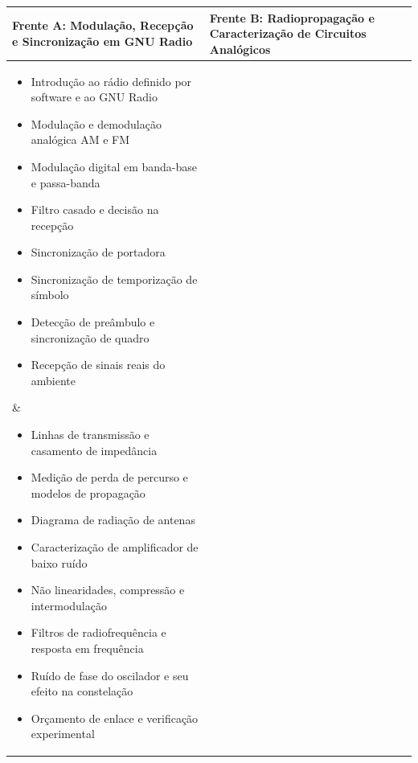 \documentclass[11pt,a4paper]{article}
\begin{document}
\begin{center}
\small
\begin{tabular}{|p{}|p{}|}
\hline
\textbf{Frente A: Modulação, Recepção e Sincronização em GNU Radio} & \textbf{Frente B: Radiopropagação e Caracterização de Circuitos Analógicos} \\
\hline
\parbox[t]{0.42\textwidth}{%
  \vspace{0.2em}
  \begin{itemize}[noitemsep, leftmargin=*, nosep, font=\small]
    \item Introdução ao rádio definido por software e ao GNU Radio
    \item Modulação e demodulação analógica AM e FM
    \item Modulação digital em banda-base e passa-banda
    \item Filtro casado e decisão na recepção
    \item Sincronização de portadora
    \item Sincronização de temporização de símbolo
    \item Detecção de preâmbulo e sincronização de quadro
    \item Recepção de sinais reais do ambiente
  \end{itemize}
  \vspace{0.2em}
} &
\parbox[t]{0.42\textwidth}{%
  \vspace{0.2em}
  \begin{itemize}[noitemsep, leftmargin=*, nosep, font=\small]
    \item Linhas de transmissão e casamento de impedância
    \item Medição de perda de percurso e modelos de propagação
    \item Diagrama de radiação de antenas
    \item Caracterização de amplificador de baixo ruído
    \item Não linearidades, compressão e intermodulação
    \item Filtros de radiofrequência e resposta em frequência
    \item Ruído de fase do oscilador e seu efeito na constelação
    \item Orçamento de enlace e verificação experimental
  \end{itemize}
  \vspace{0.2em}
} \\
\hline
\end{tabular}
\end{center}
\end{document}
